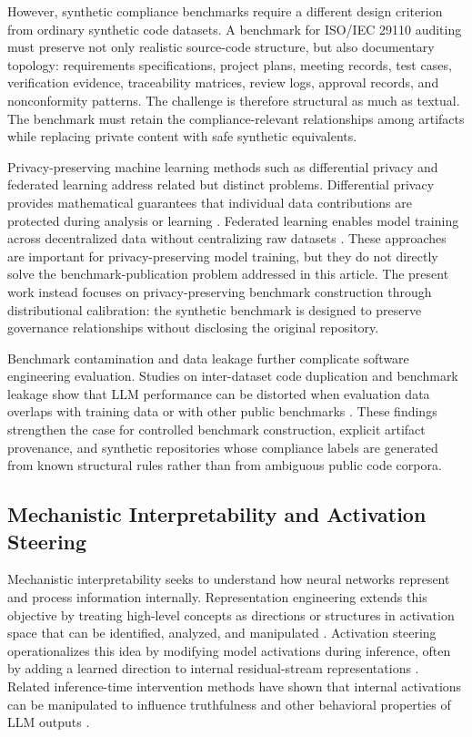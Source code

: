 \documentclass{ieeeaccess}
\begin{document}
However, synthetic compliance benchmarks require a different design criterion from ordinary synthetic code datasets. A benchmark for ISO/IEC 29110 auditing must preserve not only realistic source-code structure, but also documentary topology: requirements specifications, project plans, meeting records, test cases, verification evidence, traceability matrices, review logs, approval records, and nonconformity patterns. The challenge is therefore structural as much as textual. The benchmark must retain the compliance-relevant relationships among artifacts while replacing private content with safe synthetic equivalents.

Privacy-preserving machine learning methods such as differential privacy and federated learning address related but distinct problems. Differential privacy provides mathematical guarantees that individual data contributions are protected during analysis or learning \cite{dwork2006differentialprivacy}. Federated learning enables model training across decentralized data without centralizing raw datasets \cite{mcmahan2017communication}. These approaches are important for privacy-preserving model training, but they do not directly solve the benchmark-publication problem addressed in this article. The present work instead focuses on privacy-preserving benchmark construction through distributional calibration: the synthetic benchmark is designed to preserve governance relationships without disclosing the original repository.

Benchmark contamination and data leakage further complicate software engineering evaluation. Studies on inter-dataset code duplication and benchmark leakage show that LLM performance can be distorted when evaluation data overlaps with training data or with other public benchmarks \cite{hernandez2024codeduplication,zhou2025lessleak}. These findings strengthen the case for controlled benchmark construction, explicit artifact provenance, and synthetic repositories whose compliance labels are generated from known structural rules rather than from ambiguous public code corpora.

\subsection{Mechanistic Interpretability and Activation Steering}
\label{subsec:rw_activation_steering}

Mechanistic interpretability seeks to understand how neural networks represent and process information internally. Representation engineering extends this objective by treating high-level concepts as directions or structures in activation space that can be identified, analyzed, and manipulated \cite{zou2023representation}. Activation steering operationalizes this idea by modifying model activations during inference, often by adding a learned direction to internal residual-stream representations \cite{turner2023activation}. Related inference-time intervention methods have shown that internal activations can be manipulated to influence truthfulness and other behavioral properties of LLM outputs \cite{li2023iti}.
\end{document}

